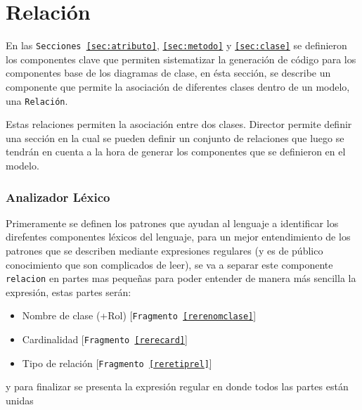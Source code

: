 \section{Relación}
\label{sec:relacion}

En las \texttt{Secciones \ref{sec:atributo}}, \texttt{\ref{sec:metodo}} y
\texttt{\ref{sec:clase}} se definieron los componentes clave que permiten
sistematizar la generación de código para los componentes base de los
diagramas de clase, en ésta sección, se describe un componente que permite
la asociación de diferentes clases dentro de un modelo, una \texttt{Relación}.

Estas relaciones permiten la asociación entre dos clases. Director permite
definir una sección en la cual se pueden definir un conjunto de relaciones que
luego se tendrán en cuenta a la hora de generar los componentes que se
definieron en el modelo.


\subsubsection{Analizador Léxico}
Primeramente se definen los patrones que ayudan al lenguaje a identificar los
direfentes componentes léxicos del lenguaje, para un mejor entendimiento de los
patrones que se describen mediante expresiones regulares (y es de público
conocimiento que son complicados de leer), se va a separar este componente
\texttt{relacion} en partes mas pequeñas para poder entender de manera más
sencilla la expresión, estas partes serán:
\begin{itemize}
  \item Nombre de clase (+Rol) [\texttt{Fragmento \ref{rerenomclase}}]
  \item Cardinalidad [\texttt{Fragmento \ref{rerecard}}]
  \item Tipo de relación [\texttt{Fragmento \ref{reretiprel}}]
\end{itemize}

y para finalizar se presenta la expresión regular en donde todos las partes
están unidas

